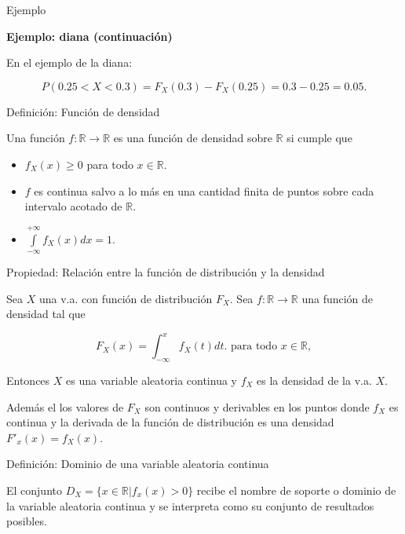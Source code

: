 \documentclass[
  letterpaper,
  DIV=11,
  numbers=noendperiod]{scrreprt}
\providecommand{\tightlist}{%
  \setlength{\itemsep}{0pt}\setlength{\parskip}{0pt}}\usepackage{longtable,booktabs,array}
\begin{document}
\begin{Ejemplo}{Ejemplo}{}

\textbf{Ejemplo: diana (continuación)}

En el ejemplo de la diana:

\[P(0.25<X<0.3)=F_{X}(0.3)-F_{X}(0.25)=0.3-0.25=0.05.\]

\end{Ejemplo}

\begin{Definicion}{Definición: Función de densidad}{}

Una función \(f:\mathbb{R}\to\mathbb{R}\) es una función de densidad
sobre \(\mathbb{R}\) si cumple que

\begin{itemize}
\tightlist
\item
  \(f_{X}(x)\geq 0\) para todo \(x \in\mathbb{R}.\)
\item
  \(f\) es continua salvo a lo más en una cantidad finita de puntos
  sobre cada intervalo acotado de \(\mathbb{R}\).
\item
  \(\displaystyle\int\limits_{-\infty}^{+\infty} f_{X}(x) dx=1.\)
\end{itemize}

\end{Definicion}

\begin{Teorema}{Propiedad: Relación entre la función de distribución y la densidad}{}

Sea \(X\) una v.a. con función de distribución \(F_X\). Sea
\(f:\mathbb{R}\to\mathbb{R}\) una función de densidad tal que

\[F_X(x)=\displaystyle\int_{-\infty}^{x} f_X(t) dt.\mbox{ para todo } x\in\mathbb{R},\]

Entonces \(X\) es una variable aleatoria continua y \(f_X\) es la
densidad de la v.a. \(X\).

Además el los valores de \(F_X\) son continuos y derivables en los
puntos donde \(f_X\) es continua y la derivada de la función de
distribución es una densidad \(F'_x(x)=f_X(x)\).

\end{Teorema}

\begin{Definicion}{Definición: Dominio de una variable aleatoria continua}{}

El conjunto \(D_X=\{x\in\mathbb{R}| f_x(x)>0\}\) recibe el nombre de
soporte o dominio de la variable aleatoria continua y se interpreta como
su conjunto de resultados posibles.

\end{Definicion}
\end{document}
